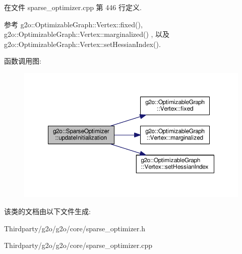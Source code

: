 在文件 sparse\-\_\-optimizer.\-cpp 第 446 行定义.



参考 g2o\-::\-Optimizable\-Graph\-::\-Vertex\-::fixed(), g2o\-::\-Optimizable\-Graph\-::\-Vertex\-::marginalized() , 以及 g2o\-::\-Optimizable\-Graph\-::\-Vertex\-::set\-Hessian\-Index().



函数调用图\-:
\nopagebreak
\begin{figure}[H]
\begin{center}
\leavevmode
\includegraphics[width=350pt]{classg2o_1_1SparseOptimizer_ae971d068585055973798f93ac2363d94_cgraph}
\end{center}
\end{figure}




该类的文档由以下文件生成\-:\begin{DoxyCompactItemize}
\item 
Thirdparty/g2o/g2o/core/sparse\-\_\-optimizer.\-h\item 
Thirdparty/g2o/g2o/core/sparse\-\_\-optimizer.\-cpp\end{DoxyCompactItemize}
